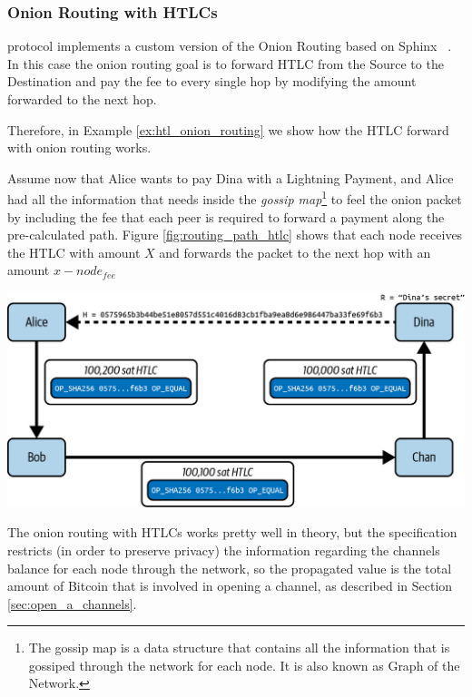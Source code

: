 \subsubsection{Onion Routing with HTLCs}

{\LN} protocol implements a custom version of the Onion Routing based on Sphinx ~\cite{cryptoeprint:2008/475}. In this case the onion routing goal is to forward HTLC from the Source to the Destination and pay the fee to
every single hop by modifying the amount forwarded to the next hop.

Therefore, in Example \ref{ex:htl_onion_routing} we show how the HTLC forward with onion routing works.

\begin{example}
  \label{ex:htl_onion_routing}
  Assume now that Alice wants to pay Dina with a Lightning Payment, and Alice had all the
  information that needs inside the \emph{gossip map}\footnote{The gossip map is a data structure that contains all the information that is gossiped through the network for each node. It is also known as Graph of the Network.} to feel the
  onion packet by including the fee that each peer is required to forward a payment
  along the pre-calculated path. Figure \ref{fig:routing_path_htlc} shows that each node receives the HTLC with
  amount $X$ and forwards the packet to the next hop with an amount $x - node_{fee}$

  {\centering
      \includegraphics[width=0.6\columnwidth]{imgs/mtln_1008.png}
  \par}  
\end{example}

The onion routing with HTLCs works pretty well in theory, but the {\LN} specification restricts (in order to preserve privacy) the information regarding
the channels balance for each node through the network, so the propagated value is the total amount of Bitcoin that is involved in opening a channel, as described in Section \ref{sec:open_a_channels}.

